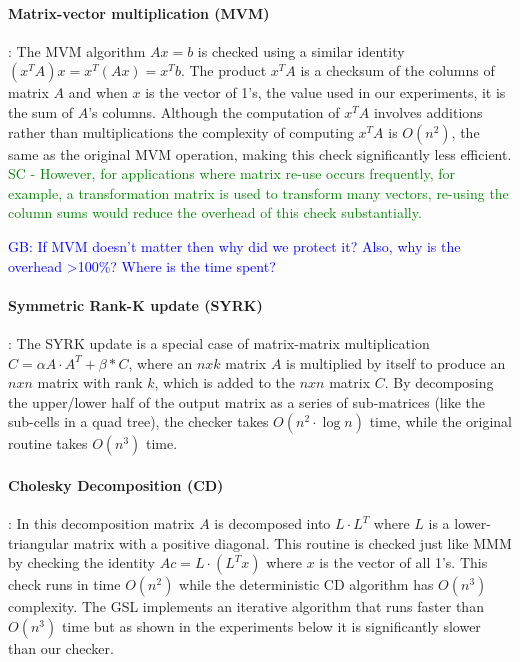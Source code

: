 \documentclass{sig-alternate}
\newcommand{\sui}[1]{%
  \textcolor{green}{SC - #1}
}
\newcommand{\greg}[1]{%
  \textcolor{blue}{GB: #1}
}
\begin{document}
\paragraph{Matrix-vector multiplication (MVM)}:
The MVM algorithm $Ax=b$ is checked using a similar identity $(x^TA)x = x^T(Ax) = x^Tb$.
The product $x^TA$ is a checksum of the columns of matrix $A$ and when $x$ is the vector of 1's, the value used in our experiments, it is the sum of $A$'s columns.
Although the computation of $x^TA$ involves additions rather than multiplications the complexity of computing $x^TA$ is $O(n^2)$, the same as the original MVM operation, making this check significantly less efficient.
\sui{However, for applications where matrix re-use occurs frequently, for example, a transformation matrix is used to transform many vectors, re-using the column sums would reduce the overhead of this check substantially.}

\greg{If MVM doesn't matter then why did we protect it? Also, why is the overhead >100\%? Where is the time spent?}

\paragraph{Symmetric Rank-K update (SYRK)}:
The SYRK update is a special case of matrix-matrix multiplication $C = \alpha A \cdot A^T + \beta*C$, where an $nxk$ matrix $A$ is multiplied by itself to produce an $nxn$ matrix with rank $k$, which is added to the $nxn$ matrix $C$.
By decomposing the upper/lower half of the output matrix as a series of sub-matrices (like the sub-cells in a quad tree), the checker takes $O(n^2 \cdot \log{n})$ time, while the original routine takes $O(n^3)$ time.

\paragraph{Cholesky Decomposition (CD)}:
In this decomposition matrix $A$ is decomposed into $L \cdot L^T$ where $L$ is a lower-triangular matrix with a positive diagonal.
This routine is checked just like MMM by checking the identity $Ac = L \cdot (L^T x)$ where $x$ is the vector of all 1's.
This check runs in time $O(n^2)$ while the deterministic CD algorithm has $O(n^3)$ complexity.
The GSL implements an iterative algorithm that runs faster than $O(n^3)$ time but as shown in the experiments below it is significantly slower than our checker.
\end{document}
